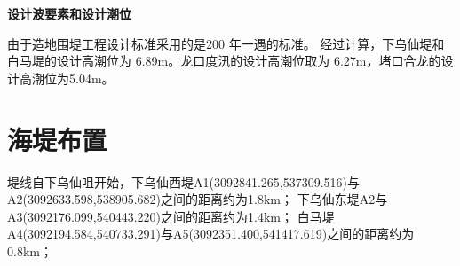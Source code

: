 \documentclass[UTF8, a4paper, 12pt]{ctexart} %
\begin{document}
\begin{table}[h]
    \centering
    \small
    \caption{堤段设计波浪要素表}
    \label{tab:wave_elements}
\end{table}


\par
\textbf{设计波要素和设计潮位}
\par
由于造地围堤工程设计标准采用的是200 年一遇的标准。
经过计算，下乌仙堤和白马堤的设计高潮位为 6.89m。龙口度汛的设计高潮位取为
6.27m，堵口合龙的设计高潮位为5.04m。
\section{海堤布置}
堤线自下乌仙咀开始，下乌仙西堤A1(3092841.265,537309.516)与A2(3092633.598,538905.682)之间的距离约为1.8km；
下乌仙东堤A2与A3(3092176.099,540443.220)之间的距离约为1.4km；
白马堤A4(3092194.584,540733.291)与A5(3092351.400,541417.619)之间的距离约为0.8km；
\end{document}

